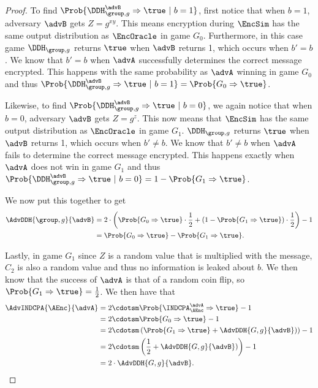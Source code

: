 \begin{proof}
	To find $\Prob{\DDH_{\group, g}^\advB\Rightarrow\true \ | \ b=1}$, first notice that when $b=1$, adversary $\advB$ gets $Z = g^{xy}$. This means encryption during $\EncSim$ has the same output distribution as $\EncOracle$ in game $G_0$. Furthermore, in this case game $\DDH_{\group, g}$ returns $\true$ when $\advB$ returns 1, which occurs when $b'=b$. We know that $b'=b$ when $\advA$ successfully determines the correct message encrypted. This happens with the same probability as $\advA$ winning in game $G_0$ and thus $\Prob{\DDH_{\group, g}^\advB\Rightarrow\true \ | \ b=1} = \Prob{G_0 \Rightarrow\true}$. 
	
	Likewise, to find $\Prob{\DDH_{\group, g}^\advB\Rightarrow\true \ | \ b=0}$, we again notice that when $b=0$, adversary $\advB$ gets $Z = g^z$. This now means that $\EncSim$ has the same output distribution as $\EncOracle$ in game $G_1$. $\DDH_{\group, g}$ returns $\true$ when $\advB$ returns 1, which occurs when $b'\neq b$. We know that $b' \neq b$ when $\advA$ fails to determine the correct message encrypted. This happens exactly when $\advA$ does not win in game $G_1$ and thus $\Prob{\DDH_{\group, g}^\advB\Rightarrow\true \ | \ b=0} = 1 - \Prob{G_1 \Rightarrow\true}$. 
	
	We now put this together to get
	\begin{align*}
		\AdvDDH{\group,g}{\advB} &= 2 \cdot \left(\Prob{G_0 \Rightarrow\true} \cdot \frac{1}{2} + (1 - \Prob{G_1 \Rightarrow\true})\cdot\frac{1}{2}\right) - 1 \\
		&= \Prob{G_0 \Rightarrow\true} - \Prob{G_1 \Rightarrow\true}.
	\end{align*}
	
	Lastly, in game $G_1$ since $Z$ is a random value that is multiplied with the message, $C_2$ is also a random value and thus no information is leaked about $b$. We then know that the success of $\advA$ is that of a random coin flip, so $\Prob{G_1 \Rightarrow\true} = \frac{1}{2}$. We then have that
	\begin{align*}
		\AdvINDCPA{\AEnc}{\advA} 
		&= 2\cdotsm\Prob{\INDCPA_{\AEnc}^\advA\Rightarrow\true} - 1\\
		&= 2\cdotsm\Prob{G_0\Rightarrow\true} - 1\\
		&= 2\cdotsm\left(\Prob{G_1\Rightarrow\true} + \AdvDDH{G,g}{\advB})\right) - 1\\
		&= 2\cdotsm\left(\frac{1}{2}+ \AdvDDH{G,g}{\advB})\right) - 1 \\
		&= 2 \cdot \AdvDDH{G,g}{\advB}.
	\end{align*}
\end{proof}

